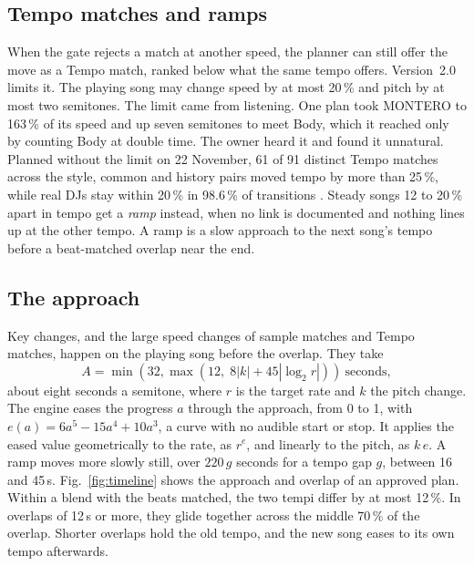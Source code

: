 \documentclass[conference,a4paper]{IEEEtran}
\newcommand{\q}[1]{\textquotedbl{}#1\textquotedbl{}}
\begin{document}
\subsection{Tempo matches and ramps}
When the gate rejects a match at another speed, the planner can still offer the move as a \q{Tempo
match}, ranked below what the same tempo offers. Version~2.0 limits it. The playing song may change
speed by at most 20\,\% and pitch by at most two semitones. The limit came from listening. One plan
took MONTERO to 163\,\% of its speed and up seven semitones to meet Body, which it reached only by
counting Body at double time. The owner heard it and found it unnatural. Planned without the limit
on 22 November, 61 of 91 distinct Tempo matches across the style, common and history pairs moved
tempo by more than 25\,\%, while real DJs stay within 20\,\% in 98.6\,\% of transitions
\cite{kim2020}. Steady songs 12 to 20\,\% apart in tempo
get a \emph{ramp} instead, when no link is documented and nothing lines up at the other tempo. A
ramp is a slow approach to the next song's tempo before a beat-matched overlap near the end.

\subsection{The approach}
Key changes, and the large speed changes of sample matches and Tempo matches, happen on the playing
song before the overlap. They take
\begin{equation}
A=\min\!\left(32,\max\!\left(12,\;8|k|+45|\log_2 r|\right)\right)\ \text{seconds},
\end{equation}
about eight seconds a semitone, where $r$ is the target rate and $k$ the pitch change. The engine
eases the progress $a$ through the approach, from 0 to 1, with $e(a)=6a^5-15a^4+10a^3$, a curve with
no audible start or stop. It applies the eased value geometrically to the rate, as $r^{e}$, and
linearly to the pitch, as $k\,e$. A ramp moves more slowly still, over $220\,g$ seconds for a tempo
gap $g$, between 16 and 45\,s. Fig.~\ref{fig:timeline} shows the approach and overlap of an approved
plan. Within a blend with the beats matched, the two tempi differ by at most 12\,\%. In overlaps
of 12\,s or more, they glide together across the middle 70\,\% of the overlap. Shorter overlaps
hold the old tempo, and the new song eases to its own tempo afterwards.
\end{document}
